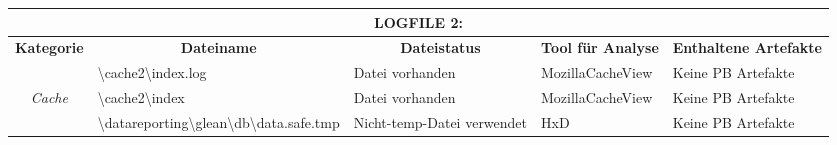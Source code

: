 \begin{appendices}
{\begin{landscape}
\begin{table}[h!]
{\begin{tabular}{cllll}
							\multicolumn{5}{c}{\textbf{LOGFILE 2:}}                                                                                                                                                                                                                                                                                                                                                                                                                                                                                                                     \\ \hline
							\multicolumn{1}{|c|}{\textbf{Kategorie}}                                                                     & \multicolumn{1}{c|}{\textbf{Dateiname}}                                                                                                                                                                             & \multicolumn{1}{c|}{\textbf{Dateistatus}}                                                         & \multicolumn{1}{c|}{\textbf{Tool für Analyse}}   & \multicolumn{1}{l|}{\textbf{Enthaltene Artefakte}}              \\ \hline
							\multicolumn{1}{|c|}{}                                                                                       & \multicolumn{1}{l|}{\cellcolor[HTML]{34CDF9}\textbackslash{}cache2\textbackslash{}index.log}                                                                                                                        & \multicolumn{1}{l|}{\cellcolor[HTML]{009901}Datei vorhanden}                                      & \multicolumn{1}{l|}{MozillaCacheView}            & \multicolumn{1}{l|}{\cellcolor[HTML]{F8A102}Keine PB Artefakte} \\ \cline{2-5} 
							\multicolumn{1}{|c|}{\multirow{-2}{*}{\textit{Cache}}}                                                       & \multicolumn{1}{l|}{\cellcolor[HTML]{34CDF9}\textbackslash{}cache2\textbackslash{}index}                                                                                                                            & \multicolumn{1}{l|}{\cellcolor[HTML]{009901}Datei vorhanden}                                      & \multicolumn{1}{l|}{MozillaCacheView}            & \multicolumn{1}{l|}{\cellcolor[HTML]{F8A102}Keine PB Artefakte} \\ \hline
							\multicolumn{1}{|c|}{}                                                                                       & \multicolumn{1}{l|}{\cellcolor[HTML]{3190FF}\textbackslash{}datareporting\textbackslash{}glean\textbackslash{}db\textbackslash{}data.safe.tmp}                                                                      & \multicolumn{1}{l|}{\cellcolor[HTML]{FCFF2F}Nicht-temp-Datei verwendet}                           & \multicolumn{1}{l|}{HxD}                         & \multicolumn{1}{l|}{\cellcolor[HTML]{F8A102}Keine PB Artefakte} \\ \cline{2-5} 

\end{tabular}}
\end{table}
\end{landscape}}
\end{appendices}
